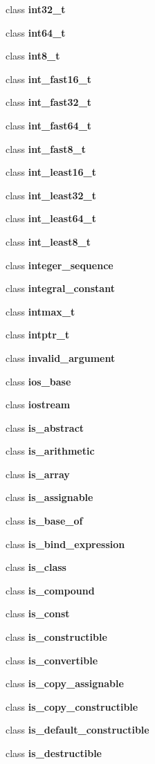 \begin{DoxyCompactItemize}
\item 
class {\bf int32\+\_\+t}
\item 
class {\bf int64\+\_\+t}
\item 
class {\bf int8\+\_\+t}
\item 
class {\bf int\+\_\+fast16\+\_\+t}
\item 
class {\bf int\+\_\+fast32\+\_\+t}
\item 
class {\bf int\+\_\+fast64\+\_\+t}
\item 
class {\bf int\+\_\+fast8\+\_\+t}
\item 
class {\bf int\+\_\+least16\+\_\+t}
\item 
class {\bf int\+\_\+least32\+\_\+t}
\item 
class {\bf int\+\_\+least64\+\_\+t}
\item 
class {\bf int\+\_\+least8\+\_\+t}
\item 
class {\bf integer\+\_\+sequence}
\item 
class {\bf integral\+\_\+constant}
\item 
class {\bf intmax\+\_\+t}
\item 
class {\bf intptr\+\_\+t}
\item 
class {\bf invalid\+\_\+argument}
\item 
class {\bf ios\+\_\+base}
\item 
class {\bf iostream}
\item 
class {\bf is\+\_\+abstract}
\item 
class {\bf is\+\_\+arithmetic}
\item 
class {\bf is\+\_\+array}
\item 
class {\bf is\+\_\+assignable}
\item 
class {\bf is\+\_\+base\+\_\+of}
\item 
class {\bf is\+\_\+bind\+\_\+expression}
\item 
class {\bf is\+\_\+class}
\item 
class {\bf is\+\_\+compound}
\item 
class {\bf is\+\_\+const}
\item 
class {\bf is\+\_\+constructible}
\item 
class {\bf is\+\_\+convertible}
\item 
class {\bf is\+\_\+copy\+\_\+assignable}
\item 
class {\bf is\+\_\+copy\+\_\+constructible}
\item 
class {\bf is\+\_\+default\+\_\+constructible}
\item 
class {\bf is\+\_\+destructible}

\end{DoxyCompactItemize}
